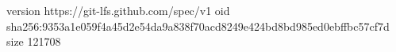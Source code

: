 version https://git-lfs.github.com/spec/v1
oid sha256:9353a1e059f4a45d2e54da9a838f70acd8249e424bd8bd985ed0ebffbc57cf7d
size 121708
